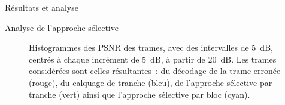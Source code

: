 \begin{chapter}{Résultats et analyse}
\begin{section}{Analyse de l'approche sélective}
\begin{figure}[htb]
\caption[Histogrammes des PSNR des trames]{Histogrammes des PSNR des trames,
avec des intervalles de 5~dB, centrés à chaque incrément de 5~dB, à partir de 20~dB. Les trames considérées sont
celles résultantes~: du décodage de la trame erronée (rouge), du calquage de
tranche (bleu), de l'approche sélective par tranche (vert) ainsi que
l'approche sélective par bloc (cyan).} 
\label{fig-FrameDistribution}
\end{figure}


\end{section}
\end{chapter}
